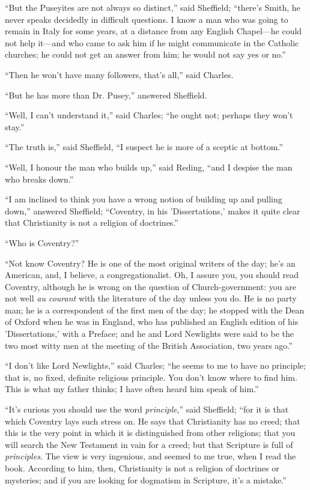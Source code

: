 ``But the Puseyites are not always so distinct,'' said
Sheffield; ``there's Smith, he never speaks decidedly in
difficult questions. I know a man who was going to remain in Italy for
some years, at a distance from any English Chapel—he could not help
it—and who came to ask him if he might communicate in the Catholic
churches; he could not get an answer from him; he would not say yes or
no.''

``Then he won't have many followers, that's all,'' said
Charles.

``But he has more than Dr. Pusey,'' answered Sheffield.

``Well, I can't understand it,'' said Charles; ``he
ought not; perhaps they won't stay.''

``The truth is,'' said Sheffield, ``I suspect he is
more of a sceptic at bottom.''

``Well, I honour the man who builds up,'' said Reding,
``and I despise the man who breaks down.''

``I am inclined to think you have a wrong notion of building up
and pulling down,'' answered Sheffield; ``Coventry, in his
'Dissertations,' makes it quite clear that Christianity is not a
religion of doctrines.''

``Who is Coventry?''

``Not know Coventry? He is one of the most original writers of
the day; he's an American, and, I believe, a congregationalist. Oh, I
assure you, you should read Coventry, although he is wrong on the
question of Church-government: you are not well \emph{au courant} with
the literature of the day unless you do. He is no party man; he is a
correspondent of the first men of the day; he stopped with the Dean of
Oxford when he was in England, who has published an English edition of
his 'Dissertations,' with a Preface; and he and Lord Newlights were
said to be the two most witty men at the meeting of the British
Association, two years ago.''

``I don't like Lord Newlights,'' said Charles; ``he
seems to me to have no principle; that is, no fixed, definite
religious principle. You don't know where to find him. This is what my
father thinks; I have often heard him speak of him.''

``It's curious you should use the word \emph{principle},''
said Sheffield; ``for it is that which Coventry lays such stress
on. He says that Christianity has no creed; that this is the very
point in which it is distinguished from other religions; that you will
search the New Testament in vain for a creed; but that Scripture
is full of \emph{principles}. The view is very ingenious, and seemed
to me true, when I read the book. According to him, then, Christianity
is not a religion of doctrines or mysteries; and if you are looking
for dogmatism in Scripture, it's a mistake.''

